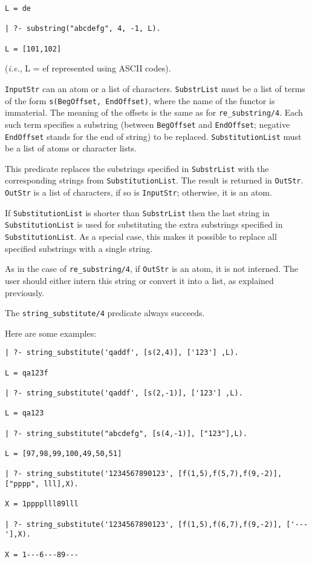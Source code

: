 \begin{description}
\begin{verbatim}
L = de

| ?- substring("abcdefg", 4, -1, L).

L = [101,102]
\end{verbatim}
({\it i.e.}, L = ef represented using ASCII codes).


{\tt InputStr} can an atom or a list of characters.  {\tt SubstrList} must
be a list of terms of the form {\tt s(BegOffset, EndOffset)}, where the name
of the functor is immaterial.  The meaning of the offsets is the same as
for {\tt re\_substring/4}.  Each such term specifies a substring (between
{\tt BegOffset} and {\tt EndOffset}; negative {\tt EndOffset} stands for
the end of string) to be replaced.  {\tt SubstitutionList} must be a list
of atoms or character lists.

This predicate replaces the substrings specified in {\tt SubstrList} with
the corresponding strings from {\tt SubstitutionList}.  The result is
returned in {\tt OutStr}. {\tt OutStr} is a list of characters, if so is
{\tt InputStr}; otherwise, it is an atom.

If {\tt SubstitutionList} is shorter than {\tt SubstrList} then the last
string in {\tt SubstitutionList} is used for substituting the extra
substrings specified in {\tt SubstitutionList}. As a special case, this
makes it possible to replace all specified substrings with a single string.

As in the case of {\tt re\_substring/4}, if {\tt OutStr} is an atom, it is
not interned.  The user should either intern this string or convert it into
a list, as explained previously.

The \verb|string_substitute/4| predicate always succeeds.

Here are some examples:
\begin{verbatim}
| ?- string_substitute('qaddf', [s(2,4)], ['123'] ,L).

L = qa123f

| ?- string_substitute('qaddf', [s(2,-1)], ['123'] ,L).

L = qa123

| ?- string_substitute("abcdefg", [s(4,-1)], ["123"],L).

L = [97,98,99,100,49,50,51]

| ?- string_substitute('1234567890123', [f(1,5),f(5,7),f(9,-2)], ["pppp", lll],X).

X = 1pppplll89lll

| ?- string_substitute('1234567890123', [f(1,5),f(6,7),f(9,-2)], ['---'],X).

X = 1---6---89---
\end{verbatim}

\end{description}



